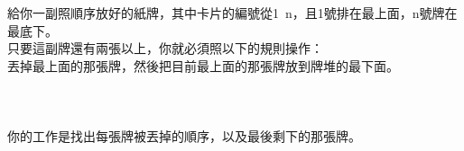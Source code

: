 給你一副照順序放好的紙牌，其中卡片的編號從1~n，且1號排在最上面，n號牌在最底下。\\
 只要這副牌還有兩張以上，你就必須照以下的規則操作：\\
丟掉最上面的那張牌，然後把目前最上面的那張牌放到牌堆的最下面。\\
\\
\\
\\
你的工作是找出每張牌被丟掉的順序，以及最後剩下的那張牌。\\
